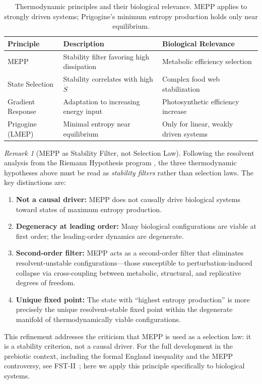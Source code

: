 \documentclass[12pt,a4paper]{article}
\theoremstyle{remark}
\newtheorem{remark}{Remark}
\begin{document}
\begin{table}[htbp]
\centering
\caption{Thermodynamic principles and their biological relevance. MEPP applies to strongly driven systems; Prigogine's minimum entropy production holds only near equilibrium.}
\label{tab:thermo-principles}
\begin{tabular}{lll}
\toprule
\textbf{Principle} & \textbf{Description} & \textbf{Biological Relevance} \\
\midrule
MEPP & Stability filter favoring high dissipation & Metabolic efficiency selection \\
State Selection & Stability correlates with high $\dot{S}$ & Complex food web stabilization \\
Gradient Response & Adaptation to increasing energy input & Photosynthetic efficiency increase \\
Prigogine (LMEP) & Minimal entropy near equilibrium & Only for linear, weakly driven systems \\
\bottomrule
\end{tabular}
\end{table}

\begin{remark}[MEPP as Stability Filter, not Selection Law]
\label{rem:mepp-stability-biology}
Following the resolvent analysis from the Riemann Hypothesis program \citep{GeigerRH2026b}, the three thermodynamic hypotheses above must be read as \emph{stability filters} rather than selection laws. The key distinctions are:
\begin{enumerate}[label=(\roman*)]
  \item \textbf{Not a causal driver:} MEPP does not causally drive biological systems toward states of maximum entropy production.
  \item \textbf{Degeneracy at leading order:} Many biological configurations are viable at first order; the leading-order dynamics are degenerate.
  \item \textbf{Second-order filter:} MEPP acts as a second-order filter that eliminates resolvent-unstable configurations---those susceptible to perturbation-induced collapse via cross-coupling between metabolic, structural, and replicative degrees of freedom.
  \item \textbf{Unique fixed point:} The state with ``highest entropy production'' is more precisely the unique resolvent-stable fixed point within the degenerate manifold of thermodynamically viable configurations.
\end{enumerate}
This refinement addresses the criticism that MEPP is used as a selection law: it is a stability criterion, not a causal driver. For the full development in the prebiotic context, including the formal England inequality and the MEPP controversy, see FST-II~\citep{FSTII}; here we apply this principle specifically to biological systems.
\end{remark}
\end{document}
